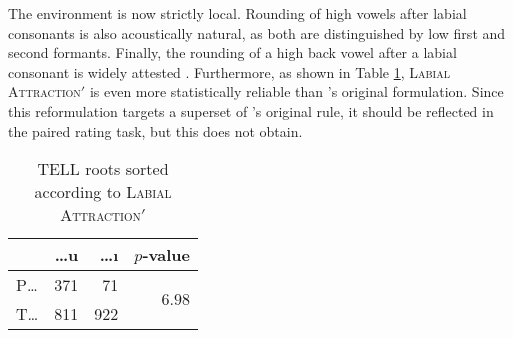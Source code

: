 \noindent
The environment is now strictly local.
Rounding of high vowels after labial consonants is also acoustically natural, as both are distinguished by low first and second formants.
Finally, the rounding of a high back vowel after a labial consonant is widely attested \citep[e.g.,][]{Vaux1993}.
Furthermore, as shown in Table \ref{lasi}, \textsc{Labial Attraction}$'$ is even more statistically reliable than \citeauthor{Lees1966a}'s original formulation.
Since this reformulation targets a superset of \citeauthor{Lees1966b}'s original rule, it should be reflected in the paired rating task, but this does not obtain.

\begin{table}[t]
\centering
\begin{tabular}{lrrr}
\toprule
       & \ldots{}u  & \ldots{}ı & $p$-value                      \\
\midrule
P\ldots{}  & 371    & 71        & \multirow{2}{*}{$6.98$\e{-49}} \\
T\ldots{}  & 811    & 922       &                                \\
\bottomrule
\end{tabular}
\caption{TELL roots sorted according to \textsc{Labial Attraction}$'$}
\label{lasi}
\end{table}




